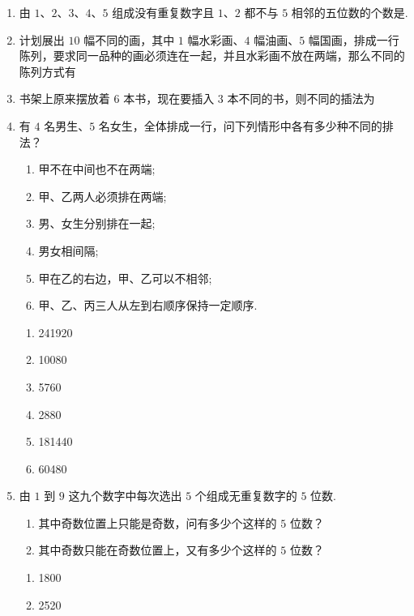 \begin{enumerate}
\item 由 $1$、$2$、$3$、$4$、$5$ 组成没有重复数字且 $1$、$2$ 都不与 $5$ 相邻的五位数的个数是.


\item 计划展出 $10$ 幅不同的画，其中 $1$ 幅水彩画、$4$ 幅油画、$5$ 幅国画，排成一行陈列，要求同一品种的画必须连在一起，并且水彩画不放在两端，那么不同的陈列方式有

\item 书架上原来摆放着 $6$ 本书，现在要插入 $3$ 本不同的书，则不同的插法为


\item 有 $4$ 名男生、$5$ 名女生，全体排成一行，问下列情形中各有多少种不同的排法？
\begin{enumerate}
\item 甲不在中间也不在两端;
\item 甲、乙两人必须排在两端;
\item 男、女生分别排在一起;
\item 男女相间隔;
\item 甲在乙的右边，甲、乙可以不相邻;
\item 甲、乙、丙三人从左到右顺序保持一定顺序.
\end{enumerate}

\begin{jieda}
    \begin{enumerate}
        \item 241920
        \item 10080
        \item 5760
        \item 2880
        \item 181440
        \item 60480
    \end{enumerate}
\end{jieda}

\item 由 $1$ 到 $9$ 这九个数字中每次选出 $5$ 个组成无重复数字的 $5$ 位数.
\begin{enumerate}
\item 其中奇数位置上只能是奇数，问有多少个这样的 $5$ 位数？
\item 其中奇数只能在奇数位置上，又有多少个这样的 $5$ 位数？
\end{enumerate}
\begin{jieda}
    \begin{enumerate}
        \item 1800
        \item 2520
    \end{enumerate}
\end{jieda}


\end{enumerate}
